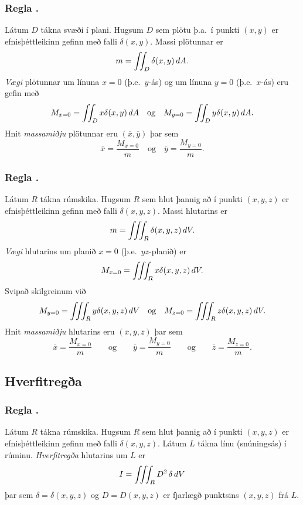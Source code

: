 \subsubsection{Regla \kaflanr.}
 Látum $D$ tákna svæði í plani.  Hugsum $D$ sem plötu þ.a.~í punkti $(x,y)$ er efnisþéttleikinn gefinn með falli $\delta(x,y)$.  Massi plötunnar er 
$$m=\int\!\!\!\int_D \delta(x,y)\,dA.$$
 {\em Vægi} plötunnar um línuna $x=0$ (þ.e.~$y$-ás) og um línuna $y=0$ (þ.e.~$x$-ás) eru gefin með
 $$M_{x=0}=\int\!\!\!\int_D x\delta(x,y)\,dA \quad \text{og} \quad M_{y=0}=\int\!\!\!\int_D y\delta(x,y)\,dA.$$
Hnit {\em massamiðju} plötunnar eru $(\overline{x}, \overline{y})$ þar sem 
$$\overline{x}=\frac{M_{x=0}}{m}
 \quad \text{og}\quad \overline{y}=\frac{M_{y=0}}{m}.$$




\subsubsection{Regla \kaflanr.}
 Látum $R$ tákna rúmskika.  Hugsum $R$ sem hlut þannig að í punkti $(x,y,z)$ er efnisþéttleikinn gefinn með falli $\delta(x,y,z)$.  Massi hlutarins er 
$$m=\int\!\!\!\int\!\!\!\int_R \delta(x,y,z)\,dV.$$
 {\em Vægi} hlutarins um planið $x=0$ (þ.e.~$yz$-planið) er
 $$M_{x=0}=\int\!\!\!\int\!\!\!\int_R x\delta(x,y,z)\,dV.$$
 Svipað skilgreinum við
 $$M_{y=0}=\thrint_R y\delta(x,y,z)\,dV 
 \quad \text{og}\quad
 M_{z=0}=\thrint_R z\delta(x,y,z)\,dV.$$
Hnit {\em massamiðju} hlutarins eru $(\overline{x}, \overline{y}, \overline{z})$ þar sem 
$$\overline{x}=\frac{M_{x=0}}{m}
\qquad\mbox{og}\qquad
\overline{y}=\frac{M_{y=0}}{m}
\qquad\mbox{og}\qquad
\overline{z}=\frac{M_{z=0}}{m}.$$





\subsection{Hverfitregða} 

\subsubsection{Regla \kaflanr.}
 Látum $R$ tákna rúmskika.  Hugsum $R$ sem hlut þannig að í punkti $(x,y,z)$ er efnisþéttleikinn gefinn með falli $\delta(x,y,z)$.  Látum $L$ tákna línu (snúningsás) í rúminu. {\em Hverfitregða} hlutarins um $L$ er
$$I=\int\!\!\!\int\!\!\!\int_R D^2 \,\delta\,dV$$
þar sem $\delta=\delta(x,y,z)$ og $D=D(x,y,z)$ er fjarlægð punktsins $(x,y,z)$ frá $L$.





